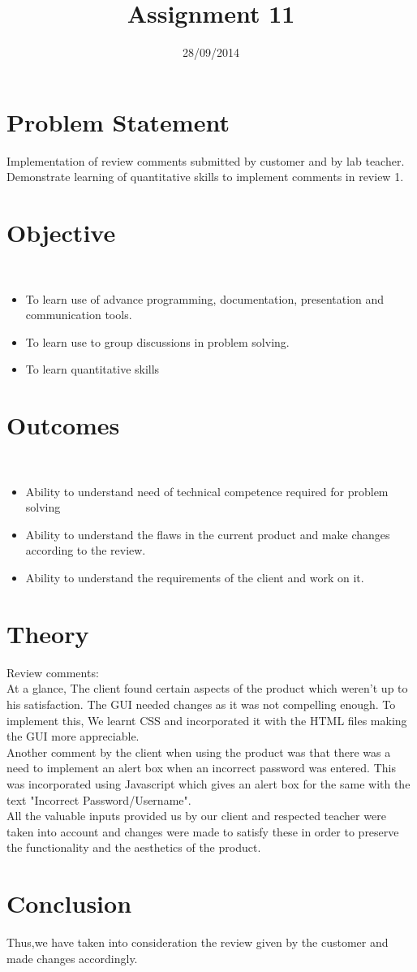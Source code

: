 \documentclass[11pt]{article}
\title{Assignment 11}
\date{ 28/09/2014}
\begin{document}
\maketitle

\section*{Problem Statement}
Implementation of review comments submitted by customer and by lab teacher. Demonstrate learning of quantitative skills to implement comments in review 1. 
\section*{Objective}\
\begin{itemize}
\item To learn use of advance programming, documentation, presentation and communication tools.
\item To learn use to group discussions in problem solving.
\item To learn quantitative skills
\end{itemize}

\section*{Outcomes}\
\begin{itemize}
\item Ability to understand need of technical competence required for problem solving
\item Ability to understand the flaws in the current product and make changes according to the review.
\item Ability to understand the requirements of the client and work on it.
\end{itemize}

\section*{Theory}
Review comments:\\
At a glance, The client found certain aspects of the product which weren't up to his satisfaction. The GUI needed changes as it was not compelling enough. To implement this, We learnt CSS and incorporated it with the HTML files making the GUI more appreciable.\\
Another comment by the client when using the product was that there was a need to implement an alert box when an incorrect password was entered. This was incorporated using Javascript which gives an alert box for the same with the text "Incorrect Password/Username".\\
All the valuable inputs provided us by our client and respected teacher were taken into account and changes were made to satisfy these in order to preserve the functionality and the aesthetics of the product.
\section*{Conclusion}
Thus,we have taken into consideration the review given by the customer and made changes accordingly.
\end{document}
